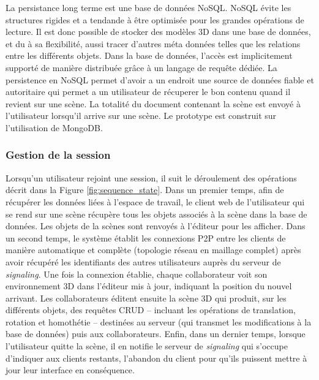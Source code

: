 La persistance long terme est une base de données NoSQL.
NoSQL évite les structures rigides et a tendande à être optimisée pour les grandes 
opérations de lecture. Il est donc possible de stocker des modèles 3D dans une 
base de données, et du à sa flexibilité, aussi tracer d'autres méta données telles 
que les relations entre les différents objets. Dans la base de données, l'accès est 
implicitement supporté de manière distribuée grâce à un langage de requête 
dédiée. La persistence en NoSQL permet d'avoir a un endroit une source de 
données fiable et autoritaire qui permet a un utilisateur de récuperer le bon contenu 
quand il revient sur une scène. La totalité du document contenant la scène est 
envoyé à l'utilisateur lorsqu'il arrive sur une scène.
Le prototype est construit sur l'utilisation de MongoDB.



\subsubsection{Gestion de la session}
Lorsqu'un utilisateur rejoint une session, il suit le déroulement des opérations 
décrit dans la Figure \ref{fig:sequence_state}. 
Dans un premier temps, afin de récupérer les données liées à l'espace de travail, 
le client web de l'utilisateur qui se rend sur une scène récupère 
tous les objets associés à la scène dans la base de données. Les objets de la 
scènes sont renvoyés à l'éditeur pour les afficher. 
Dans un second temps, le système établit les connexions \gls{P2P} entre les 
clients de manière automatique et complète (topologie réseau en maillage 
complet) après avoir récupéré les identifiants des autres utilisateurs auprès du 
serveur de \textit{signaling}. Une fois la connexion établie, chaque collaborateur 
voit son environnement 3D dans l'éditeur mis à jour, indiquant la position du nouvel 
arrivant. Les collaborateurs éditent ensuite la scène 3D qui produit, sur les 
différents objets, des requêtes \gls{CRUD} -- incluant les opérations de translation, 
rotation et homothétie -- destinées au serveur (qui transmet les 
modifications à la base de données) puis aux collaborateurs.
Enfin, dans un dernier temps, lorsque l'utilisateur quitte la scène, il en notifie le 
serveur de \textit{signaling} qui s'occupe d'indiquer aux clients restants, l'abandon 
du client pour qu'ils puissent mettre à jour leur interface en conséquence.

